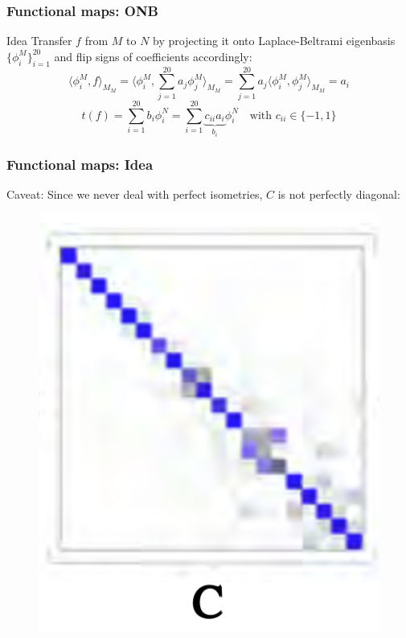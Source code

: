 \documentclass[compress]{beamer}
\begin{document}
\begin{frame}[fragile]
\frametitle{Functional maps: ONB}
\begin{block}{Idea}
Transfer $f$ from $M$ to $N$ by projecting it onto Laplace-Beltrami eigenbasis $\{\phi_i^M\}_{i=1}^{20}$ and flip signs of coefficients accordingly:
$$
	 \langle \phi_i^M, f \rangle_{M_M} = \langle \phi_i^M, \sum_{j=1}^{20} a_j\phi_j^M \rangle_{M_M} = \sum_{j=1}^{20} a_j \langle \phi_i^M, \phi_j^M  \rangle_{M_M} = a_i 
$$
$$
	t(f) = \sum_{i=1}^{20} b_i \phi_i^N = \sum_{i=1}^{20} \underbrace{c_{ii} a_i}_{b_i} \phi_i^N \quad \text{with } c_{ii} \in \{-1, 1\} 
$$
\end{block}
\end{frame}

\begin{frame}[fragile]
\frametitle{Functional maps: Idea}
Caveat: Since we never deal with perfect isometries, $C$ is not perfectly diagonal:
\begin{figure}[h]
	\centering
	\includegraphics[width=.3\textwidth]{C.png}
\end{figure}
\end{frame}
\end{document}
